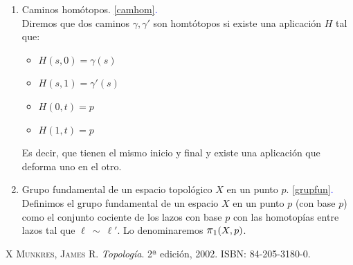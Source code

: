 \documentclass[12pt,twoside]{report}
\theoremstyle{azul}
\theoremstyle{azul2}
\theoremstyle{plain}
\theoremstyle{definition}
\theoremstyle{remark}
\begin{document}
\begin{enumerate}[1)]
    $\gamma \cdot \gamma'(t)=\gamma(2t)$ si $t\in [0,\nicefrac{1}{2}]$ y $\gamma \cdot \gamma'(t)=\gamma'(2t-1)$ si $t\in [\nicefrac{1}{2},1]$.
    \item Caminos homótopos. \textcolor{blue}{\ref{camhom}.}  \\
    Diremos que dos caminos $\gamma, \gamma'$ son homtótopos si existe una aplicación $H$ tal que:
    \begin{itemize}
        \item $H(s,0)=\gamma (s) $
        \item $H(s,1)=\gamma' (s) $
        \item $H(0,t)=p$
        \item $H(1,t)=p$
    \end{itemize} 
    Es decir, que tienen el mismo inicio y final y existe una aplicación que deforma uno en el otro.
    \item Grupo fundamental de un espacio topológico $X$ en un punto $p$. \textcolor{blue}{\ref{grupfun}.}  \\
    Definimos el grupo fundamental de un espacio $X$ en un punto $p$ (con base $p$) como el conjunto cociente de los lazos con base $p$ con las homotopías entre lazos tal que $\ell \: \sim \: \ell'$. Lo denominaremos $\mathlarger{\mathlarger{\pi_1}}(X,p)$.
\end{enumerate}

\begin{thebibliography}{X}
     \textsc{Munkres, James R.}
        \textit{Topología}. 2ª edición, 2002. ISBN: 84-205-3180-0.
\end{thebibliography}
\end{document}
